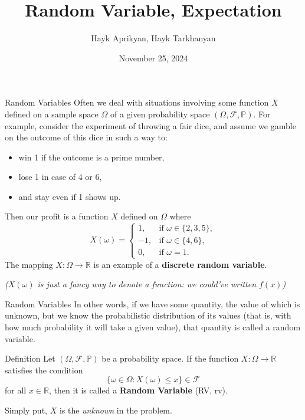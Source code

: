 \documentclass{beamer}
\title[Lecture 9]{Random Variable, Expectation}
\author[Aprikyan, Tarkhanyan]{Hayk Aprikyan, Hayk Tarkhanyan}
\institute[ACA]{Armenian Code Academy}
\date{November 25, 2024}
\newcommand{\PP}{\mathbb{P}}
\newcommand{\F}{\mathcal{F}}
\begin{document}
\begin{frame}
  \titlepage
\end{frame}


\begin{frame}{Random Variables}
Often we deal with situations involving some function \( X \) defined on a sample space \( \Omega \) of a given probability space \( (\Omega, \F, \PP) \). \pause For example, consider the experiment of throwing a fair dice, and assume we gamble on the outcome of this dice in such a way to:
\begin{itemize}
    \item win 1 if the outcome is a prime number,
    \item lose 1 in case of 4 or 6,
    \item and stay even if 1 shows up.
\end{itemize}
\pause Then our profit is a function \( X \) defined on \( \Omega \) where
\[ X(\omega) =
\begin{cases}
1, & \text{if } \omega \in \{2, 3, 5\}, \\
-1, & \text{if } \omega \in \{4, 6\}, \\
0, & \text{if } \omega = 1.
\end{cases}
\]
\pause The mapping \( X: \Omega \to \mathbb{R} \) is an example of a \textbf{discrete random variable}.

\textit{($X(\omega)$ is just a fancy way to denote a function: we could've written $f(x)$)}
\end{frame}



\begin{frame}{Random Variables}
In other words, if we have some quantity, the value of which is unknown, but we know the probabilistic distribution of its values (that is, with how much probability it will take a given value), that quantity is called a random variable.\pause 

\begin{block}{Definition}
    Let \( (\Omega, \F, \PP) \) be a probability space. If the function \( X : \Omega \to \mathbb{R} \) satisfies the condition
\[ \{\omega \in \Omega : X(\omega) \leq x\} \in \F \]
for all \( x \in \mathbb{R} \), then it is called a \textbf{Random Variable} (RV, rv).

\end{block}

\pause

Simply put, $X$ is the \textit{unknown} in the problem.


\end{frame}
\end{document}
